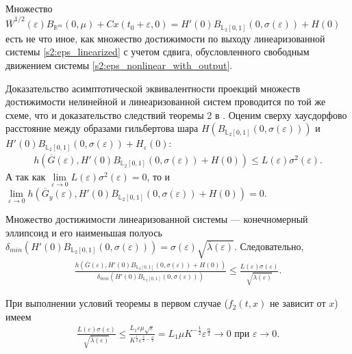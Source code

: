 \documentclass[../main.tex]{subfiles}
\begin{document}
 Множество $\overline{W}^{1/2}(\varepsilon)B_{\mathbb{R}^m}(0,\mu) + Cx(t_0+\varepsilon,0) = H'(0)B_{\mathbb{L}_2[0,1]}(0,\sigma(\varepsilon))+ H(0)$ есть не что иное, как множество достижимости по выходу линеаризованной системы \eqref{s2:eps_linearized} с учетом сдвига, обусловленного свободным движением системы \eqref{s2:eps_nonlinear_with_output}.
 
 Доказательство асимптотической эквивалентности проекций множеств достижимости нелинейной и линеаризованной систем проводится по той же схеме, что и доказательство следствий теоремы 2 в \cite{GusevUMJ}. 
Оценим сверху хаусдорфово расстояние между образами гильбертова шара $ H\left( B_{\mathbb{L}_2[0,1]}(0,\sigma(\varepsilon))\right) $ и $ H'(0)B_{\mathbb{L}_2[0,1]}(0,\sigma(\varepsilon))+ H_{\varepsilon}(0) $:
 \begin{gather*}
 h\left( \overline{G}(\varepsilon), H'(0)B_{\mathbb{L}_2[0,1]}(0,\sigma(\varepsilon))+ H(0)\right) \leqslant L(\varepsilon) \sigma^2(\varepsilon).
 \end{gather*}
 А так как $ \lim\limits_{\varepsilon \rightarrow 0} L(\varepsilon) \sigma^2(\varepsilon) = 0 $, то и $ \lim\limits_{\varepsilon \rightarrow 0} h\left( \overline{G}_y(\varepsilon), H'(0)B_{\mathbb{L}_2[0,1]}(0,\sigma(\varepsilon))+ H(0)\right) = 0 $.
 
 
 Множество достижимости линеаризованной системы --- конечномерный эллипсоид и его наименьшая полуось $ \delta_{min}\left(H'(0)B_{\mathbb{L}_2[0,1]}(0,\sigma(\varepsilon)) \right)=\sigma(\varepsilon)\sqrt{\overline{\lambda}(\varepsilon)} $. 
 Следовательно,
 \begin{gather*}
 \frac{h\left(\overline{G}(\varepsilon), H'(0)B_{\mathbb{L}_2[0,1]}(0,\sigma(\varepsilon))+ H(0)\right) }{\delta_{min}\left( H'(0)B_{\mathbb{L}_2[0,1]}(0,\sigma(\varepsilon))\right) } \leqslant \frac{L(\varepsilon) \sigma(\varepsilon)}{\sqrt{\overline{\lambda}(\varepsilon)}}.
 \end{gather*}
 
 При выполнении условий теоремы в первом случае ($ f_2(t,x) $ не зависит от $ x $) имеем
 \begin{gather*}
 \frac{L(\varepsilon) \sigma(\varepsilon)}{\sqrt{\overline{\lambda}(\varepsilon)}} 
 \leqslant
 \frac{L_1\varepsilon\mu\sqrt{\varepsilon}}{K^{\frac{1}{2}}\varepsilon^{\frac{3}{2}-\frac{\alpha}{2}}} 
 =
 L_1\mu K^{-\frac{1}{2}}\varepsilon^{\frac{\alpha}{2}} \rightarrow 0 \mbox{\ при\ } \varepsilon \rightarrow 0.
 \end{gather*}
 
\end{document}
